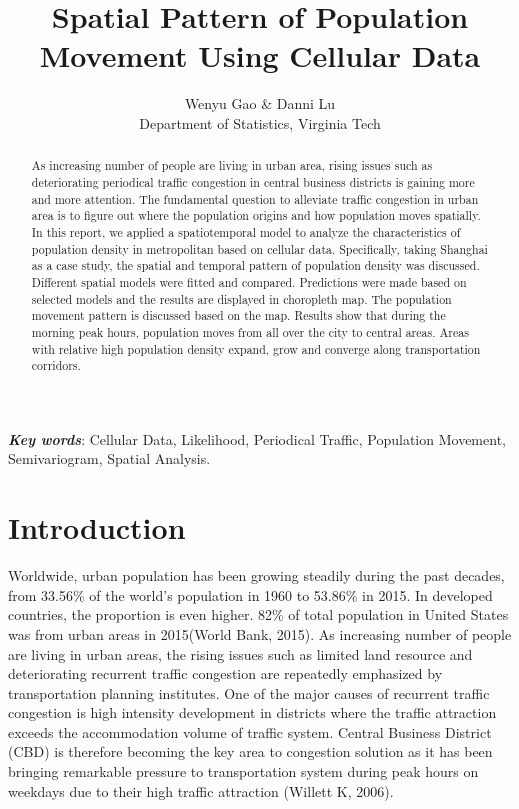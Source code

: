 \documentclass[hidelinks,12pt]{article}
\date{}
\author{Wenyu Gao \& Danni Lu \\ Department of Statistics, Virginia Tech}
\title{Spatial Pattern of Population Movement Using Cellular Data }
\begin{document}
	\maketitle
	
	\begin{abstract}
		As increasing number of people are living in urban area, rising issues such as deteriorating periodical traffic congestion in central business districts is gaining more and more attention. The fundamental question to alleviate traffic congestion in urban area is to figure out where the population origins and how population moves spatially. In this report, we applied a spatiotemporal model to analyze the characteristics of population density in metropolitan based on cellular data. Specifically, taking Shanghai as a case study, the spatial and temporal pattern of population density was discussed. Different spatial models were fitted and compared. Predictions were made based on selected models and the results are displayed in choropleth map. The population movement pattern is discussed based on the map. Results show that during the morning peak hours, population moves from all over the city to central areas. Areas with relative high population density expand, grow and converge along transportation corridors. 
	\end{abstract}
	\textbf{ {\em Key words}}: Cellular Data, Likelihood, Periodical Traffic, Population Movement, Semivariogram, Spatial Analysis.
	
	\section{Introduction}\label{sec:intro}
	Worldwide, urban population has been growing steadily during the past decades, from 33.56\% of the world's population in 1960 to 53.86\% in 2015. In developed countries, the proportion is even higher. 82\% of total population in United States was from urban areas in 2015(World Bank, 2015). As increasing number of people are living in urban areas, the rising issues such as limited land resource and deteriorating recurrent traffic congestion are repeatedly emphasized by transportation planning institutes. One of the major causes of recurrent traffic congestion is high intensity development in districts where the traffic attraction exceeds the accommodation volume of traffic system. Central Business District (CBD) is therefore becoming the key area to congestion solution as it has been bringing remarkable pressure to transportation system during peak hours on weekdays due to their high traffic attraction (Willett K, 2006). \\
	
\end{document}
